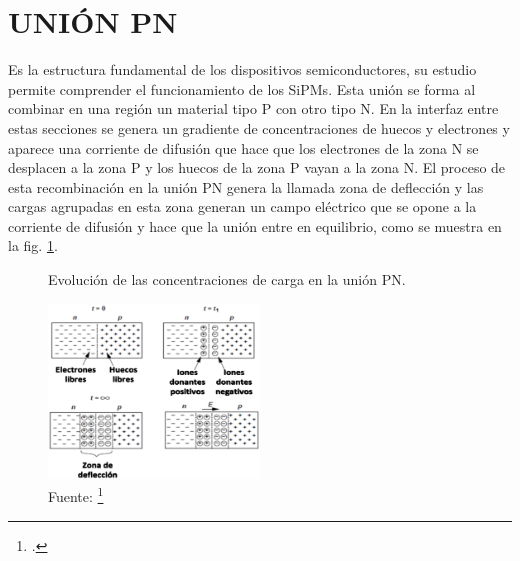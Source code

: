 \section{UNIÓN PN}
Es la estructura fundamental de los dispositivos semiconductores, su estudio permite comprender el funcionamiento de los SiPMs. Esta unión se forma al combinar en una región un material tipo P con otro tipo N. En la interfaz entre estas secciones se genera un gradiente de concentraciones de huecos y electrones y aparece una corriente de difusión que hace que los electrones de la zona N se desplacen a la zona P y los huecos de la zona P vayan a la zona N. El proceso de esta recombinación en la unión PN genera la llamada zona de deflección y las cargas agrupadas en esta zona generan un campo eléctrico que se opone a la corriente de difusión y hace que la unión entre en equilibrio, como se muestra en la fig. \ref{fig:PNjuntion}.
\begin{figure}[h!]
\begin{centering}
  \caption{Evolución de las concentraciones de carga en la unión PN.}
  \includegraphics[width=0.5\textwidth]{Images/UnionPN.eps}
  \caption*{Fuente: \footcite{Book_razavi}}
  \label{fig:PNjuntion}
  \par\end{centering}
\end{figure}

